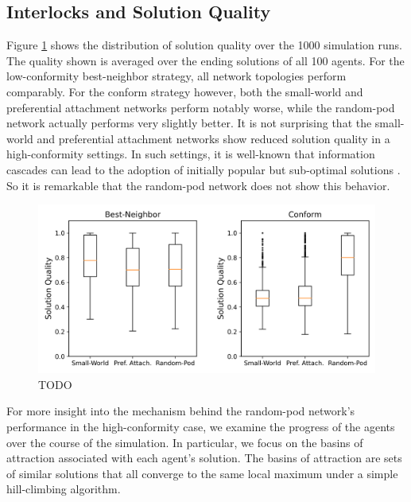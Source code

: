\documentclass[manuscript,screen,review,acmsmall]{acmart}
\begin{document}
\subsection{Interlocks and Solution Quality}
Figure \ref{fig:quality} shows the distribution of solution quality over
the 1000 simulation runs.
The quality shown is averaged over the ending solutions of all 100 agents.
For the low-conformity best-neighbor strategy,
all network topologies perform comparably.
For the conform strategy however,
both the small-world and preferential attachment networks
perform notably worse, while the random-pod network actually performs
very slightly better.
It is not surprising that the small-world and preferential attachment networks
show reduced solution quality in a high-conformity settings.
In such settings, it is well-known that information cascades can lead to the adoption of initially popular but sub-optimal solutions
\cite{banerjee_simple_1992}.
So it is remarkable that the random-pod network does not show this behavior.

\begin{figure}
\begin{center}
\includegraphics[width=5in]{fig-netdelib-results-net-boxplot.png}
\caption{TODO}
\label{fig:quality}
\begin{description}
\end{description}
\end{center}
\end{figure}

For more insight into the mechanism behind the random-pod network's
performance in the high-conformity case,
we examine the progress of the agents over the course of the simulation.
In particular, we focus on the basins of attraction associated with each agent's solution.
The basins of attraction are sets of similar solutions that all converge
to the same local maximum under a simple hill-climbing algorithm.
\end{document}
